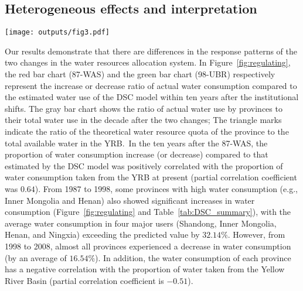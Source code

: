 \documentclass[preprint, 12pt]{elsarticle}
\begin{document}
\subsection{Heterogeneous effects and interpretation}\label{result-3}

\begin{figure*}[!htb]
	\centering
	\texttt{[image: outputs/fig3.pdf]}
	\caption{
		Regulating differences for provinces in the YRB.\\
		Red (the 87-WAS) and green (the 98-UBR) bars denote an increased or decreased ratio for actual water use relative to the estimate from the model in the decade after the institutional shift.
		The grey bars indicate the proportions of actual water use for each province relative to their total water use in the decade after the institutional shift.
		The triangles mark the water quotas assigned under the institution, converted to ratios by dividing by their sum.
	}\label{fig:regulating}
\end{figure*}

Our results demonstrate that there are differences in the response patterns of the two changes in the water resources allocation system.
In Figure~\ref{fig:regulating}, the red bar chart (87-WAS) and the green bar chart (98-UBR) respectively represent the increase or decrease ratio of actual water consumption compared to the estimated water use of the DSC model within ten years after the institutional shifts.
The gray bar chart shows the ratio of actual water use by provinces to their total water use in the decade after the two changes; The triangle marks indicate the ratio of the theoretical water resource quota of the province to the total available water in the YRB.\
In the ten years after the 87-WAS, the proportion of water consumption increase (or decrease) compared to that estimated by the DSC model was positively correlated with the proportion of water consumption taken from the YRB at present (partial correlation coefficient was $0.64$).
From 1987 to 1998, some provinces with high water consumption (e.g., Inner Mongolia and Henan) also showed significant increases in water consumption (Figure~\ref{fig:regulating} and Table~\ref{tab:DSC_summary}), with the average water consumption in four major users (Shandong, Inner Mongolia, Henan, and Ningxia) exceeding the predicted value by $32.14\%$.
However, from 1998 to 2008, almost all provinces experienced a decrease in water consumption (by an average of $16.54\%$).
In addition, the water consumption of each province has a negative correlation with the proportion of water taken from the Yellow River Basin (partial correlation coefficient is $-0.51$).
\end{document}
